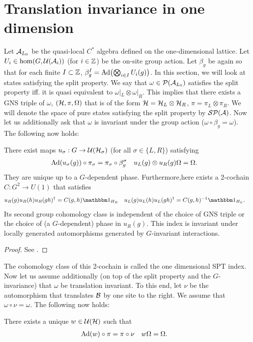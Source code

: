 \documentclass[11pt,a4paper,twoside]{article}
\numberwithin{equation}{section}
\begin{document}
	\section{Translation invariance in one dimension}\label{sec:OneDimensionalIndices}
	Let $\AA_{L_0}$ be the quasi-local $C^*$ algebra defined on the one-dimensional lattice. Let $U_i\in\hom(G,\UU(\AA_i))$ (for $i\in\ZZ$) be the on-site group action. Let $\beta_g$ be again so that for each finite $I\subset \ZZ$, $\beta_g^I=\Ad{\bigotimes_{i\in I}U_i(g)}$. In this section, we will look at states satisfying the split property. We say that $\omega\in\PP(\AA_{L_0})$ satisfies the split property iff. it is quasi equivalent to $\omega|_{L}\otimes\omega|_{R}$. This implies that there exists a GNS triple of $\omega$, $(\HH,\pi,\Omega)$ that is of the form $\HH=\HH_L\otimes\HH_R$, $\pi=\pi_L\otimes\pi_R$. We will denote the space of pure states satisfying the split property by $\mathcal{S}\PP(\AA)$. Now let us additionally ask that $\omega$ is invariant under the group action ($\omega\circ\beta_g=\omega$). The following now holds:
	\begin{lemma}
		There exist maps $u_\sigma:G\rightarrow \UU(\HH_\sigma)$ (for all $\sigma\in\{L,R\}$) satisfying
		\begin{align}
			\Ad{u_\sigma(g)}\circ\pi_\sigma&=\pi_\sigma\circ\beta_g^\sigma&u_L(g)\otimes u_R(g)\Omega&=\Omega.
		\end{align}
		They are unique up to a $G$-dependent phase. Furthermore,here exists a 2-cochain $C:G^2\rightarrow U(1)$ that satisfies
		\begin{align}
			u_R(g)u_R(h)u_R(gh)^{\dagger}&=C(g,h)\id_{H_R}&u_L(g)u_L(h)u_L(gh)^{\dagger}&=C(g,h)^{-1}\id_{H_L}.
		\end{align}
		Its second group cohomology class is independent of the choice of GNS triple or the choice of (a $G$-dependent) phase in $u_R(g)$. This index is invariant under locally generated automorphisms generated by $G$-invariant interactions.
	\end{lemma}
	\begin{proof}
		See \cite{ogata2019classification}.
	\end{proof}
	The cohomology class of this 2-cochain is called the one dimensional SPT index. Now let us assume additionally (on top of the split property and the $G$-invariance) that $\omega$ be translation invariant. To this end, let $\nu$ be the automorphism that translates $\BB$ by one site to the right. We assume that $\omega\circ\nu=\omega$. The following now holds:
	\begin{lemma}
		There exists a unique $w\in\UU(\HH)$ such that
		\begin{align}
			\Ad{w}\circ\pi&=\pi\circ\nu&w\Omega&=\Omega.
		\end{align}
	\end{lemma}
\end{document}

